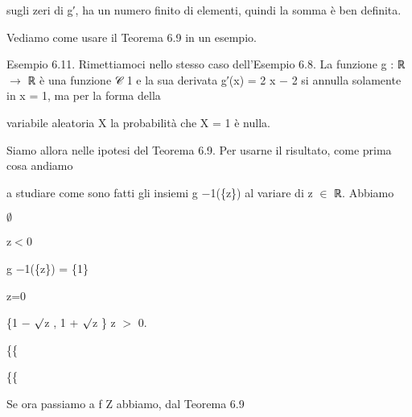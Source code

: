 \documentclass[a4paper,portrait,12pt]{article}
\begin{document}
\begin{flushleft}
sugli zeri di g′, ha un numero finito di elementi, quindi la somma \`{e} ben definita.
\end{flushleft}


\begin{flushleft}
Vediamo come usare il Teorema 6.9 in un esempio.
\end{flushleft}


\begin{flushleft}
Esempio 6.11. Rimettiamoci nello stesso caso dell'Esempio 6.8. La funzione g : ℝ $\rightarrow$ ℝ \`{e} una funzione 𝒞 1 e la sua derivata g′(x) = 2 x $-$ 2 si annulla solamente in x = 1, ma per la forma della
\end{flushleft}


\begin{flushleft}
variabile aleatoria X la probabilit\`{a} che X = 1 \`{e} nulla.
\end{flushleft}


\begin{flushleft}
Siamo allora nelle ipotesi del Teorema 6.9. Per usarne il risultato, come prima cosa andiamo
\end{flushleft}


\begin{flushleft}
a studiare come sono fatti gli insiemi g $-$1(\{z\}) al variare di z $\in$ ℝ. Abbiamo
\end{flushleft}


$\emptyset$


\begin{flushleft}
z$<$0
\end{flushleft}


\begin{flushleft}
g $-$1(\{z\}) = \{1\}
\end{flushleft}


\begin{flushleft}
z=0
\end{flushleft}


\begin{flushleft}
\{1 $-$ $\surd$z , 1 + $\surd$z \} z $>$ 0.
\end{flushleft}





\{\{


\{\{





\begin{flushleft}
Se ora passiamo a f Z abbiamo, dal Teorema 6.9
\end{flushleft}
\end{document}
